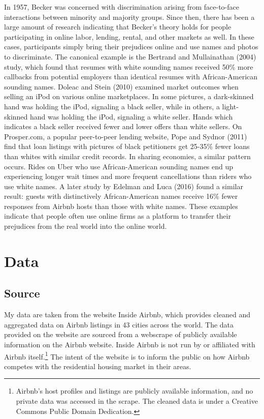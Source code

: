 \documentclass[11pt, oneside]{article}
\begin{document}
In 1957, Becker was concerned with discrimination arising from face-to-face interactions between minority and majority groups. Since then, there has been a large amount of research indicating that Becker's theory holds for people participating in online labor, lending, rental, and other markets as well. In these cases, participants simply bring their prejudices online and use names and photos to discriminate. The canonical example is the Bertrand and Mullainathan (2004) study, which found that resumes with white sounding names received 50\% more callbacks from potential employers than identical resumes with African-American sounding names.\cite{bertrand} Doleac and Stein (2010) examined market outcomes when selling an iPod on various online marketplaces. In some pictures, a dark-skinned hand was holding the iPod, signaling a black seller, while in others, a light-skinned hand was holding the iPod, signaling a white seller.\cite{doleac} Hands which indicates a black seller received fewer and lower offers than white sellers. On Prosper.com, a popular peer-to-peer lending website, Pope and Sydnor (2011) find that loan listings with pictures of black petitioners get 25-35\% fewer loans than whites with similar credit records.\cite{pope} In sharing economies, a similar pattern occurs. Rides on Uber who use African-American sounding names end up experiencing longer wait times and more frequent cancellations than riders who use white names.\cite{knittel} A later study by Edelman and Luca (2016) found a similar result: guests with distinctively African-American names receive 16\% fewer responses from Airbnb hosts than those with white names.\cite{edelman2} These examples indicate that people often use online firms as a platform to transfer their prejudices from the real world into the online world.   



\section{Data}
\subsection{Source} %

My data are taken from the website Inside Airbnb, which provides cleaned and aggregated data on Airbnb listings in 43 cities across the world.\cite{insideairbnb} The data provided on the website are sourced from a webscrape of publicly available information on the Airbnb website. Inside Airbnb is not run by or affiliated with Airbnb itself.\footnote{Airbnb's host profiles and listings are publicly available information, and no private data was accessed in the scrape. The cleaned data is under a Creative Commons Public Domain Dedication.} The intent of the website is to inform the public on how Airbnb competes with the residential housing market in their areas. 
\end{document}
